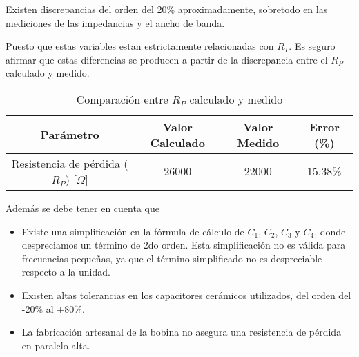 Existen discrepancias del orden del 20\% aproximadamente, sobretodo en las mediciones de las impedancias y el ancho de banda.

Puesto que estas variables estan estrictamente relacionadas con $R_T$. Es seguro afirmar que estas diferencias se producen a partir de la discrepancia entre el $R_P$ calculado y medido.

\begin{table}[h]
    \centering
    \begin{tabular}{|c|c|c|c|}
        \hline
        \textbf{Parámetro} & \textbf{Valor Calculado} & \textbf{Valor Medido} & \textbf{Error (\%)} \\
        \hline
        Resistencia de pérdida ($R_P$) [$\Omega$] & 26000 & 22000 & 15.38\% \\
        \hline
    \end{tabular}
    \caption{Comparación entre $R_P$ calculado y medido}
    \label{tab:rp_comparacion}
\end{table}

Además se debe tener en cuenta que
\begin{itemize}
    \item Existe una simplificación en la fórmula de cálculo de $C_1$, $C_2$, $C_3$ y $C_4$, donde despreciamos un término de 2do orden. Esta simplificación no es válida para frecuencias pequeñas, ya que el término simplificado no es despreciable respecto a la unidad.
    \item Existen altas tolerancias en los capacitores cerámicos utilizados, del orden del -20\% al +80\%.
    \item La fabricación artesanal de la bobina no asegura una resistencia de pérdida en paralelo alta.
\end{itemize}
